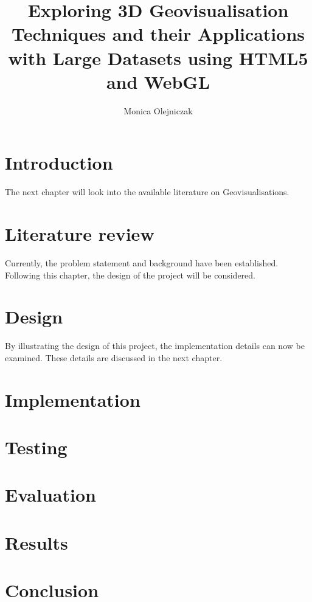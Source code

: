\documentclass[
	paper=A4,
    titlepage=true,
	fontsize=11pt,
	parskip=half
]{scrreprt}
\title{Exploring 3D Geovisualisation Techniques and their Applications with Large Datasets using HTML5 and WebGL}
\author{Monica Olejniczak}
\begin{document}
	

	\setcounter{page}{1}
	
	\chapter{Introduction} {
	\label{ch:introduction}
		
	}

	The next chapter will look into the available literature on Geovisualisations.

	\chapter{Literature review} {
	\label{ch:literature_review}
		
	}

	Currently, the problem statement and background have been established. Following this chapter, the design of the project will be considered.
	
	\chapter{Design} {
	\label{ch:design}
		
	}

	By illustrating the design of this project, the implementation details can now be examined. These details are discussed in the next chapter.
	
	\chapter{Implementation} {
	\label{ch:implementation}
		
	}


	\chapter{Testing} {
	\label{ch:testing}
		
	}


	\chapter{Evaluation} {
	\label{ch:evaluation}
		
	}


	\chapter{Results} {
	\label{ch:results}
		
	}


	\chapter{Conclusion} {
	\label{ch:conclusion}
		
	}
	
	\renewcommand{\bibname}{References}
	\printbibliography[notcategory=exclude]
	
\end{document}
